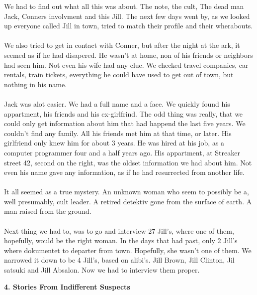 \documentclass[]{article}
\begin{document}
We had to find out what all this was about. The note, the cult, The dead man Jack, Conners involvment and this Jill. The next few days went by, as we looked up everyone called Jill in town, tried to match their profile and their wherabouts. 
\\ \\
We also tried to get in contact with Conner, but after the night at the ark, it seemed as if he had disapered. He wasn't at home, non of his friends or neighbors had seen him. Not even his wife had any clue. We checked travel companies, car rentals, train tickets, everything he could have used to get out of town, but nothing in his name. 
\\ \\
Jack was alot easier. We had a full name and a face. We quickly found his appartment, his friends and his ex-girlfrind. The odd thing was really, that we could only get information about him that had happend the last five years. We couldn't find any family. All his friends met him at that time, or later. His girlfriend only knew him for about 3 years. He was hired at his job, as a computer programmer four and a half years ago. His appartment, at Streaker street 42, second on the right, was the oldset information we had about him. Not even his name gave any information, as if he had resurrected from another life. 
\\ \\
It all seemed as a true mystery. An unknown woman who seem to possibly be a, well presumably, cult leader. A retired detektiv gone from the surface of earth. A man raised from the ground.
\\ \\
Next thing we had to, was to go and interview 27 Jill's, where one of them, hopefully, would be the right woman. In the days that had past, only 2 Jill's where dokumentet to departer from town. Hopefully, she wasn't one of them. We narrowed it down to be 4 Jill's, based on alibi's. Jill Brown, Jill Clinton, Jil satsuki and Jill Absalon. Now we had to interview them proper.

\newpage

\begin{center}
	\large\textbf{4. Stories From Indifferent Suspects}
\end{center}
\end{document}
